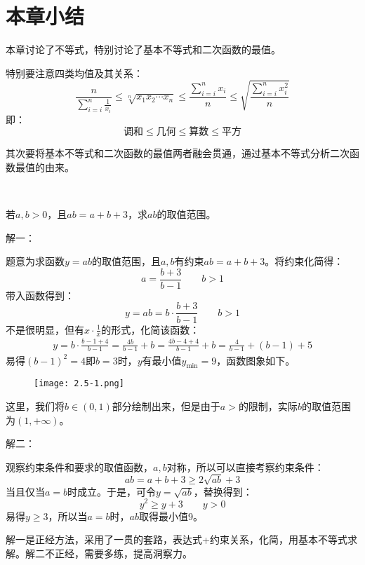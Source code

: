 \section{本章小结}

本章讨论了不等式，特别讨论了基本不等式和二次函数的最值。

特别要注意四类均值及其关系：
\[
\frac{n}{\sum_{i=i}^n{\frac{1}{x_i}}}\leqslant \sqrt[n]{x_1x_2\cdots x_n}\leqslant \frac{\sum_{i=i}^n{x_i}}{n}\leqslant \sqrt{\frac{\sum_{i=i}^n{x_{i}^{2}}}{n}}
\]
即：
\[
\text{调和}\leqslant \text{几何}\leqslant \text{算数}\leqslant \text{平方}
\]

其次要将基本不等式和二次函数的最值两者融会贯通，通过基本不等式分析二次函数最值的由来。

~

\begin{example}
若$a,b>0$，且$ab=a+b+3$，求$ab$的取值范围。
\end{example}

解一：

题意为求函数$y=ab$的取值范围，且$a,b$有约束$ab=a+b+3$。将约束化简得：
\[
a=\frac{b+3}{b-1} \qquad b>1
\]
带入函数得到：
\[
y=ab=b\cdot \frac{b+3}{b-1} \qquad b>1
\]
不是很明显，但有$x\cdot \frac{1}{x}$的形式，化简该函数：
\begin{align*}
y=b\cdot \frac{b-1+4}{b-1}=\frac{4b}{b-1}+b=\frac{4b-4+4}{b-1}+b=\frac{4}{b-1}+\left( b-1 \right) +5
\end{align*}
易得$\left( b-1 \right) ^2=4$即$b=3$时，$y$有最小值$y_{\min}=9$，函数图象如下。
\begin{figure}[h]
\centering
\texttt{[image: 2.5-1.png]}
\end{figure}

这里，我们将$b\in \left( 0,1 \right) $部分绘制出来，但是由于$a>$的限制，实际$b$的取值范围为$\left( 1,+\infty \right) $。

解二：

观察约束条件和要求的取值函数，$a,b$对称，所以可以直接考察约束条件：
\[
ab=a+b+3\geqslant 2\sqrt{ab}+3
\]
当且仅当$a=b$时成立。于是，可令$y=\sqrt{ab}$，替换得到：
\[
y^2\geqslant y+3 \qquad y>0
\]
易得$y\geqslant 3$，所以当$a=b$时，$ab$取得最小值9。

\begin{tcolorbox}
解一是正经方法，采用了一贯的套路，表达式+约束关系，化简，用基本不等式求解。解二不正经，需要多练，提高洞察力。
\end{tcolorbox}





